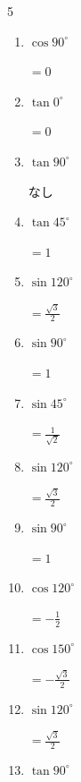 \begin{multicols}{5}
\begin{enumerate}
        $\displaystyle =-\frac{1}{\sqrt{3}}$

  \item $\displaystyle \cos{90^\circ}$

        $\displaystyle =0$

  \item $\displaystyle \tan{0^\circ}$

        $\displaystyle =0$

  \item $\displaystyle \tan{90^\circ}$

        $\displaystyle なし$

  \item $\displaystyle \tan{45^\circ}$

        $\displaystyle =1$

  \item $\displaystyle \sin{120^\circ}$

        $\displaystyle =\frac{\sqrt{3}}{2}$

  \item $\displaystyle \sin{90^\circ}$

        $\displaystyle =1$

  \item $\displaystyle \sin{45^\circ}$

        $\displaystyle =\frac{1}{\sqrt{2}}$

  \item $\displaystyle \sin{120^\circ}$

        $\displaystyle =\frac{\sqrt{3}}{2}$

  \item $\displaystyle \sin{90^\circ}$

        $\displaystyle =1$

  \item $\displaystyle \cos{120^\circ}$

        $\displaystyle =-\frac{1}{2}$

  \item $\displaystyle \cos{150^\circ}$

        $\displaystyle =-\frac{\sqrt{3}}{2}$

  \item $\displaystyle \sin{120^\circ}$

        $\displaystyle =\frac{\sqrt{3}}{2}$

\columnbreak %

  \item $\displaystyle \tan{90^\circ}$


\end{enumerate}
\end{multicols}
